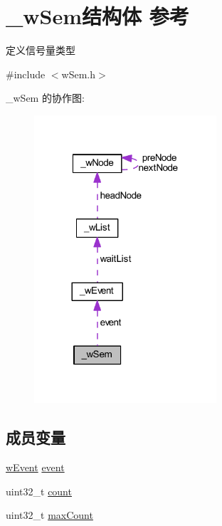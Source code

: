 \hypertarget{struct__w_sem}{}\section{\+\_\+w\+Sem结构体 参考}
\label{struct__w_sem}


定义信号量类型  




{\ttfamily \#include $<$w\+Sem.\+h$>$}



\+\_\+w\+Sem 的协作图\+:
\nopagebreak
\begin{figure}[H]
\begin{center}
\leavevmode
\includegraphics[width=192pt]{struct__w_sem__coll__graph}
\end{center}
\end{figure}
\subsection*{成员变量}
\begin{DoxyCompactItemize}
\item 
\mbox{\hyperlink{w_event_8h_af8b15988a26e1ac0d63eaf3fc5afe9d3}{w\+Event}} \mbox{\hyperlink{struct__w_sem_ad737d3f95a5cf9ee457f37f1cedfa44a}{event}}
\item 
uint32\+\_\+t \mbox{\hyperlink{struct__w_sem_a86988a65e0d3ece7990c032c159786d6}{count}}
\item 
uint32\+\_\+t \mbox{\hyperlink{struct__w_sem_a1cc8a4ba5eee24b560f9869012941e91}{max\+Count}}
\end{DoxyCompactItemize}


